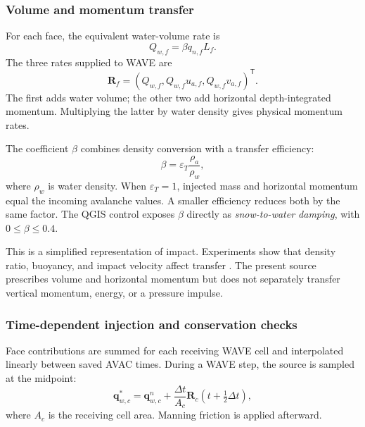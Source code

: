 \documentclass[11pt,a4paper]{article}
\begin{document}
\subsubsection{Volume and momentum transfer}

For each face, the equivalent water-volume rate is
\begin{equation}
  Q_{w,f}=\beta q_{n,f}L_f.
  \label{eq:water-volume-rate}
\end{equation}
The three rates supplied to WAVE are
\begin{equation}
  \boldsymbol{R}_f=
  \left(Q_{w,f},Q_{w,f}u_{a,f},Q_{w,f}v_{a,f}\right)^{\mathsf T}.
  \label{eq:coupling-source}
\end{equation}
The first adds water volume; the other two add horizontal depth-integrated
momentum. Multiplying the latter by water density gives physical momentum
rates.

The coefficient $\beta$ combines density conversion with a transfer
efficiency:
\begin{equation}
  \beta=\varepsilon_T\frac{\rho_a}{\rho_w},
  \label{eq:coupling-beta}
\end{equation}
where $\rho_w$ is water density. When $\varepsilon_T=1$, injected mass and
horizontal momentum equal the incoming avalanche values. A smaller efficiency
reduces both by the same factor. The QGIS control exposes $\beta$ directly
as \emph{snow-to-water damping}, with $0\leq\beta\leq0.4$.

This is a simplified representation of impact. Experiments show that
density ratio, buoyancy, and impact velocity affect transfer
\citep{ZittiEtAl2016}. The present source prescribes volume and horizontal
momentum but does not separately transfer vertical momentum, energy, or a
pressure impulse.

\subsubsection{Time-dependent injection and conservation checks}

Face contributions are summed for each receiving WAVE cell and interpolated
linearly between saved AVAC times. During a WAVE step, the source is sampled
at the midpoint:
\begin{equation}
  \boldsymbol{q}_{w,c}^{*}
  =\boldsymbol{q}_{w,c}^{n}
   +\frac{\Delta t}{A_c}
    \boldsymbol{R}_c\!\left(t+\tfrac12\Delta t\right),
  \label{eq:wave-source-update}
\end{equation}
where $A_c$ is the receiving cell area. Manning friction is applied afterward.
\end{document}
